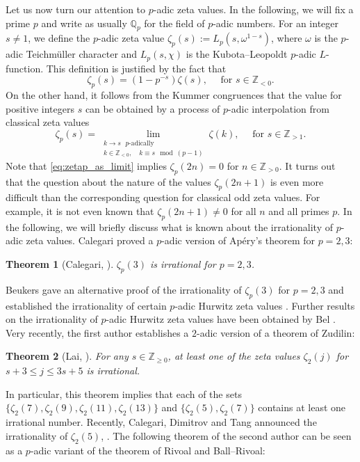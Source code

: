 \documentclass[12pt]{article}
\newtheorem*{theorem*}{Theorem}
\numberwithin{equation}{section}
\begin{document}
Let us now turn our attention to $p$-adic zeta values. In the following, we will fix a prime $p$ and write as usually $\mathbb{Q}_p$ for the field of $p$-adic numbers. For an integer $s\neq 1$, we define the $p$-adic zeta value $\zeta_p(s):=L_p(s, \omega^{1-s})$, where $\omega$ is the $p$-adic Teichmüller character and $L_p(s,\chi)$ is the Kubota--Leopoldt $p$-adic $L$-function. This definition is justified by the fact that
\[
	\zeta_p(s)=(1-p^{-s})\zeta(s), \quad \text{ for } s\in \mathbb{Z}_{<0}.
\]
On the other hand, it follows from the Kummer congruences that the value for positive integers $s$ can be obtained by a process of $p$-adic interpolation from classical zeta values
\begin{equation}\label{eq:zetap_as_limit}
	\zeta_p(s)=\lim_{\substack{ k\to s \text{ $p$-adically}\\  k\in \mathbb{Z}_{<0},\quad  k\equiv s \mod (p-1) }}\zeta (k), \quad \text{ for } s\in \mathbb{Z}_{> 1}.
\end{equation}
Note that \eqref{eq:zetap_as_limit} implies $\zeta_p(2n)=0$ for $n\in \mathbb{Z}_{>0}$. It turns out that the question about the nature of the values $\zeta_p(2n+1)$ is even more difficult than the corresponding question for classical odd zeta values. For example, it is not even known that $\zeta_p(2n+1)\neq 0$ for all $n$ and all primes $p$. In the following, we will briefly discuss what is known about the irrationality of $p$-adic zeta values. Calegari proved a $p$-adic version of Ap\'ery's theorem for $p=2,3$:
\begin{theorem*}[Calegari, \cite{Cal05}]
$\zeta_p(3)$ is irrational for $p=2,3$.
\end{theorem*}
Beukers gave an alternative proof of the irrationality of $\zeta_p(3)$ for $p=2,3$ and established the irrationality of certain $p$-adic Hurwitz zeta values \cite{Beu08}. Further results on the irrationality of $p$-adic Hurwitz zeta values have been obtained by Bel \cite{Bel10,Bel19}. Very recently, the first author establishes a $2$-adic version of a theorem of Zudilin:
 \begin{theorem*}[Lai, \cite{Lai2023}]
 For any $s \in \mathbb{Z}_{\geqslant 0}$, at least one of the zeta values $\zeta_2(j)$ for $s+3\leqslant j\leqslant 3s+5$ is irrational.
 \end{theorem*}
In particular, this theorem implies that each of the sets $\{\zeta_2(7),\zeta_2(9),\zeta_2(11),\zeta_2(13)\}$ and $\{\zeta_2(5),\zeta_2(7)\}$ contains at least one irrational number. Recently, Calegari, Dimitrov and Tang announced the irrationality of $\zeta_2(5)$, \cite{CDT20}. The following theorem of the second author can be seen as a $p$-adic variant of the theorem of Rivoal and Ball--Rivoal:
\end{document}
